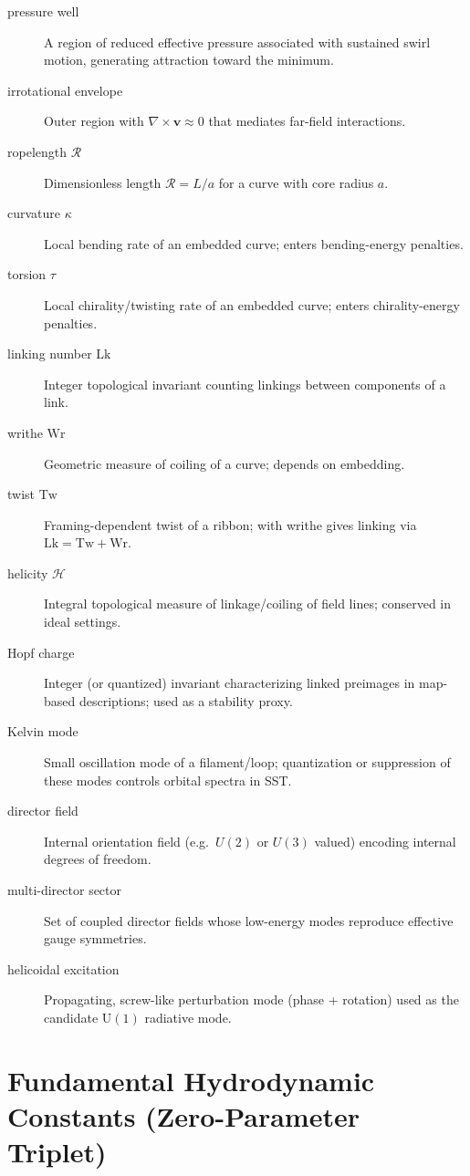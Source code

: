 \documentclass[10pt]{article}
\begin{document}
\begin{description}
\item[pressure well] A region of reduced effective pressure associated with sustained swirl motion, generating attraction toward the minimum.
\item[irrotational envelope] Outer region with $\nabla\times\mathbf{v}\approx 0$ that mediates far-field interactions.
\item[ropelength $\mathcal{R}$] Dimensionless length $\mathcal{R}=L/a$ for a curve with core radius $a$.
\item[curvature $\kappa$] Local bending rate of an embedded curve; enters bending-energy penalties.
\item[torsion $\tau$] Local chirality/twisting rate of an embedded curve; enters chirality-energy penalties.
\item[linking number $\mathrm{Lk}$] Integer topological invariant counting linkings between components of a link.
\item[writhe $\mathrm{Wr}$] Geometric measure of coiling of a curve; depends on embedding.
\item[twist $\mathrm{Tw}$] Framing-dependent twist of a ribbon; with writhe gives linking via $\mathrm{Lk}=\mathrm{Tw}+\mathrm{Wr}$.
\item[helicity $\mathcal{H}$] Integral topological measure of linkage/coiling of field lines; conserved in ideal settings.
\item[Hopf charge] Integer (or quantized) invariant characterizing linked preimages in map-based descriptions; used as a stability proxy.
\item[Kelvin mode] Small oscillation mode of a filament/loop; quantization or suppression of these modes controls orbital spectra in SST.
\item[director field] Internal orientation field (e.g.\ $U(2)$ or $U(3)$ valued) encoding internal degrees of freedom.
\item[multi-director sector] Set of coupled director fields whose low-energy modes reproduce effective gauge symmetries.
\item[helicoidal excitation] Propagating, screw-like perturbation mode (phase + rotation) used as the candidate $\mathrm{U}(1)$ radiative mode.
\end{description}

\clearpage

    
    \appendix

    \section{Fundamental Hydrodynamic Constants (Zero-Parameter Triplet)}
    \label{app:constants_triplet}
\end{document}
